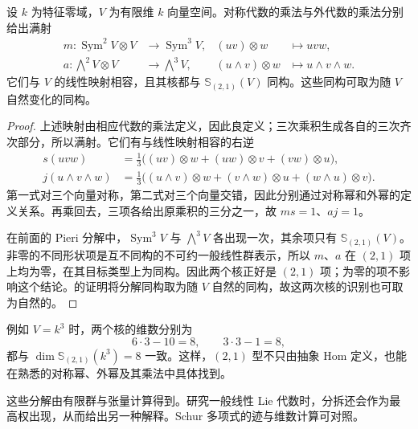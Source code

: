 \begin{proposition}\label{b5:prop:schur-21-kernels}
	设 \(k\) 为特征零域，\(V\) 为有限维 \(k\) 向量空间。对称代数的乘法与外代数的乘法分别给出满射
	\[
		\begin{aligned}
			m:\operatorname{Sym}^2V\otimes V&\longrightarrow\operatorname{Sym}^3V, &(uv)\otimes w&\longmapsto uvw,\\
			a:\bigwedge^2V\otimes V&\longrightarrow\bigwedge^3V, &(u\wedge v)\otimes w&\longmapsto u\wedge v\wedge w.
		\end{aligned}
	\]
	它们与 \(V\) 的线性映射相容，且其核都与 \(\mathbb S_{(2,1)}(V)\) 同构。这些同构可取为随 \(V\) 自然变化的同构。
\end{proposition}
\begin{proof}
	上述映射由相应代数的乘法定义，因此良定义；三次乘积生成各自的三次齐次部分，所以满射。它们有与线性映射相容的右逆
	\[
		\begin{aligned}
			s(uvw)&=\tfrac13\bigl((uv)\otimes w+(uw)\otimes v+(vw)\otimes u\bigr),\\
			j(u\wedge v\wedge w)&=\tfrac13\bigl((u\wedge v)\otimes w +(v\wedge w)\otimes u+(w\wedge u)\otimes v\bigr).
		\end{aligned}
	\]
	第一式对三个向量对称，第二式对三个向量交错，因此分别通过对称幂和外幂的定义关系。再乘回去，三项各给出原乘积的三分之一，故 \(ms=1\)、\(aj=1\)。

	在前面的 Pieri 分解中，\(\operatorname{Sym}^3V\) 与 \(\bigwedge^3V\) 各出现一次，其余项只有 \(\mathbb S_{(2,1)}(V)\)。非零的不同形状项是互不同构的不可约一般线性群表示，所以 \(m\)、\(a\) 在 \((2,1)\) 项上均为零，在其目标类型上为同构。因此两个核正好是 \((2,1)\) 项；为零的项不影响这个结论。的证明将分解同构取为随 \(V\) 自然的同构，故这两次核的识别也可取为自然的。
\end{proof}

例如 \(V=k^3\) 时，两个核的维数分别为
\[
	6\cdot3-10=8,\qquad 3\cdot3-1=8,
\]
都与 \(\dim\mathbb S_{(2,1)}(k^3)=8\) 一致。这样，\((2,1)\) 型不只由抽象 Hom 定义，也能在熟悉的对称幂、外幂及其乘法中具体找到。

\ProseParagraphBreak
这些分解由有限群与张量计算得到。研究一般线性 Lie 代数时，分拆还会作为最高权出现，从而给出另一种解释。Schur 多项式的迹与维数计算可对照\cite[Sections 5.21--5.22, pp. 128--130]{EtingofEtAl2011RepresentationTheory}。
